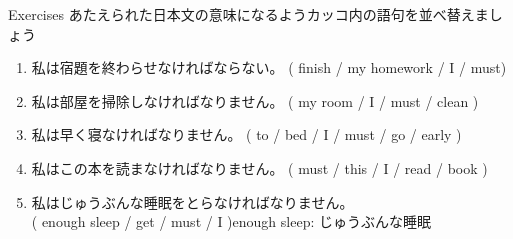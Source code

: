 \documentclass[aspectratio=169,xcolor={dvipsnames,table}]{beamer}
\newcommand{\myaudio}[1]{\href{#1}{\faVolumeUp}}
\begin{document}
\begin{frame}[plain]{Exercises}
あたえられた日本文の意味になるようカッコ内の語句を並べ替えましょう\hfill{\myaudio{./audio/013_must_02.mp3}}
\begin{enumerate}
 \item {\small 私は宿題を終わらせなければならない。}
( finish / my homework / I / must)\\
 \item {\small 私は部屋を掃除しなければなりません。}
( my room / I / must / clean )\\
 \item {\small 私は早く寝なければなりません。}
( to / bed / I / must / go / early )\\
 \item {\small 私はこの本を読まなければなりません。}
( must / this / I / read / book )\\
 \item {\small 私はじゅうぶんな睡眠をとらなければなりません。}\\
( enough sleep / get / must / I )\hfill{\footnotesize enough sleep: じゅうぶんな睡眠}\\
\end{enumerate}
\end{frame}
\end{document}
